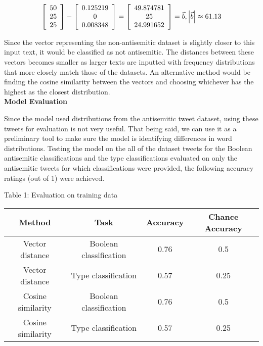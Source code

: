 \documentclass{article}
\begin{document}
\[
\left[ {\begin{array}{c}
    50\\
    25\\
    25\\
  \end{array} } \right] - \left[ {\begin{array}{c}
    0.125219\\
    0\\
    0.008348\\
  \end{array} } \right] = \left[ {\begin{array}{c}
    49.874781\\
    25\\
    24.991652\\
  \end{array} } \right] = \vec{b},\hfill \left| \vec{b} \right| \approx 61.13
\]

Since the vector representing the non-antisemitic dataset is slightly closer to this input text, it would be classified as not antisemitic. The distances between these vectors becomes smaller as larger texts are inputted with frequency distributions that more closely match those of the datasets. An alternative method would be finding the cosine similarity between the vectors and choosing whichever has the highest as the closest distribution.\\

{\bf Model Evaluation}

Since the model used distributions from the antisemitic tweet dataset, using these tweets for evaluation is not very useful. That being said, we can use it as a preliminary tool to make sure the model is identifying differences in word distributions. Testing the model on the all of the dataset tweets for the Boolean antisemitic classifications and the type classifications evaluated on only the antisemitic tweets for which classifications were provided, the following accuracy ratings (out of 1) were achieved.
\begin{center}
Table 1: Evaluation on training data\\
\begin{tabular}{ |c|c|c|c| } 
 \hline
{\bf Method} & \bf{Task} & \bf{Accuracy} & \bf{Chance Accuracy}\\
\hline
 Vector distance & Boolean classification & 0.76 & 0.5\\ 
 Vector distance & Type classification & 0.57 & 0.25\\ 
 Cosine similarity & Boolean classification & 0.76 & 0.5\\ 
 Cosine similarity & Type classification & 0.57 & 0.25\\ 
 \hline
\end{tabular}
\end{center}
\end{document}
